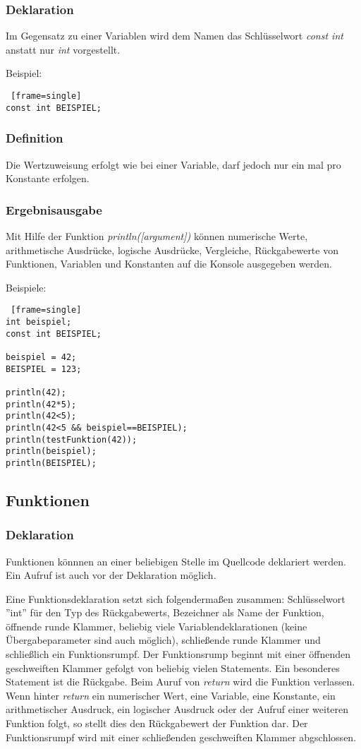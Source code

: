 \subsubsection{Deklaration}
Im Gegensatz zu einer Variablen wird dem Namen das Schlüsselwort \textit{const int} anstatt nur \textit{int} vorgestellt.

Beispiel:
\begin{lstlisting} [frame=single] 
const int BEISPIEL;
\end{lstlisting}

\subsubsection{Definition}
Die Wertzuweisung erfolgt wie bei einer Variable, darf jedoch nur ein mal pro Konstante erfolgen.
 

\subsubsection{Ergebnisausgabe}
Mit Hilfe der Funktion \textit{println([argument])} können numerische Werte, arithmetische Ausdrücke, logische Ausdrücke, Vergleiche, Rückgabewerte von Funktionen, Variablen und Konstanten auf die Konsole ausgegeben werden.

Beispiele:
\begin{lstlisting} [frame=single] 
int beispiel;
const int BEISPIEL;

beispiel = 42;
BEISPIEL = 123;

println(42);
println(42*5);
println(42<5);
println(42<5 && beispiel==BEISPIEL);
println(testFunktion(42));
println(beispiel);
println(BEISPIEL);
\end{lstlisting}


\subsection{Funktionen}

\subsubsection{Deklaration}
Funktionen könnnen an einer beliebigen Stelle im Quellcode deklariert werden. Ein Aufruf ist auch vor der Deklaration möglich.

Eine Funktionsdeklaration setzt sich folgendermaßen zusammen:
Schlüsselwort ''int'' für den Typ des Rückgabewerts, Bezeichner als Name der Funktion, öffnende runde Klammer, beliebig viele Variablendeklarationen (keine Übergabeparameter sind auch möglich), schließende runde Klammer und schließlich ein Funktionsrumpf.
Der Funktionsrump beginnt mit einer öffnenden geschweiften Klammer gefolgt von beliebig vielen Statements. 
Ein besonderes Statement ist die Rückgabe. Beim Auruf von \textit{return} wird die Funktion verlassen. Wenn hinter \textit{return} ein numerischer Wert, eine Variable, eine Konstante, ein arithmetischer Ausdruck, ein logischer Ausdruck oder der Aufruf einer weiteren Funktion folgt, so stellt dies den Rückgabewert der Funktion dar.
Der Funktionsrumpf wird mit einer schließenden geschweiften Klammer abgschlossen.

